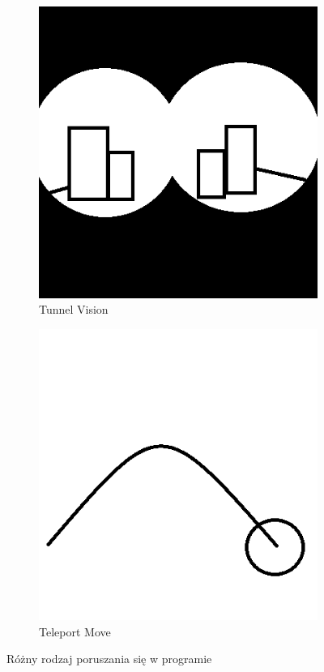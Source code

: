 \documentclass[a4paper,12pt,reqno]{article}
\begin{document}
{\begin{figure}[!ht]%
	\centering
	\begin{subfigure}{.5\textwidth}
		\centering
		\includegraphics[width=0.8\linewidth]{graphics/tunnelvision.png}
		\caption{Tunnel Vision}	
		\label{ref:subref_a}
	\end{subfigure}%
	\begin{subfigure}{.5\textwidth}
		\centering
		\includegraphics[width=0.8\linewidth]{graphics/teleportmove.png}
		\caption{Teleport Move}
		\label{ref:subref_b}
	\end{subfigure}%

\caption{Różny rodzaj poruszania się w programie}
\label{ref:ref}
\end{figure}
}
\end{document}
